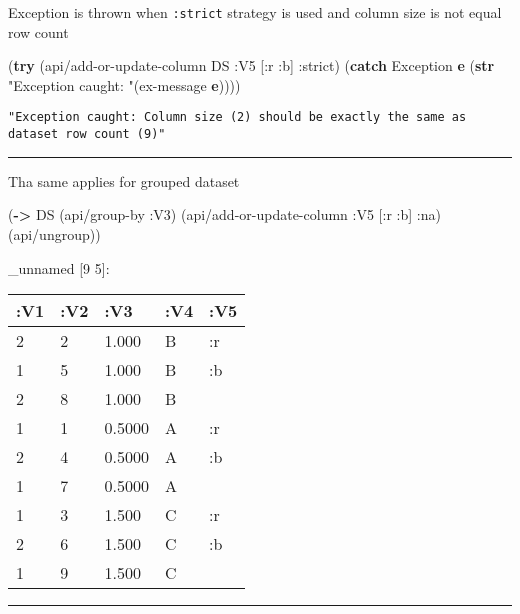 \documentclass[]{article}
\newenvironment{Shaded}{\begin{snugshade}}{\end{snugshade}}
\newcommand{\KeywordTok}[1]{\textcolor[rgb]{0.13,0.29,0.53}{\textbf{#1}}}
\newcommand{\StringTok}[1]{\textcolor[rgb]{0.31,0.60,0.02}{#1}}
\newcommand{\AttributeTok}[1]{\textcolor[rgb]{0.77,0.63,0.00}{#1}}
\newcommand{\NormalTok}[1]{#1}
\begin{document}
Exception is thrown when \texttt{:strict} strategy is used and column
size is not equal row count

\begin{Shaded}
\begin{Highlighting}[]
\NormalTok{(}\KeywordTok{try}
\NormalTok{  (api/add-or-update-column DS }\AttributeTok{:V5}\NormalTok{ [}\AttributeTok{:r} \AttributeTok{:b}\NormalTok{] }\AttributeTok{:strict}\NormalTok{)}
\NormalTok{  (}\KeywordTok{catch}\NormalTok{ Exception }\KeywordTok{e}\NormalTok{ (}\KeywordTok{str} \StringTok{"Exception caught: "}\NormalTok{(ex-message }\KeywordTok{e}\NormalTok{))))}
\end{Highlighting}
\end{Shaded}

\begin{verbatim}
"Exception caught: Column size (2) should be exactly the same as dataset row count (9)"
\end{verbatim}

\begin{center}\rule{0.5\linewidth}{0.5pt}\end{center}

Tha same applies for grouped dataset

\begin{Shaded}
\begin{Highlighting}[]
\NormalTok{(}\KeywordTok{->}\NormalTok{ DS}
\NormalTok{    (api/group-by }\AttributeTok{:V3}\NormalTok{)}
\NormalTok{    (api/add-or-update-column }\AttributeTok{:V5}\NormalTok{ [}\AttributeTok{:r} \AttributeTok{:b}\NormalTok{] }\AttributeTok{:na}\NormalTok{)}
\NormalTok{    (api/ungroup))}
\end{Highlighting}
\end{Shaded}

\_unnamed {[}9 5{]}:

\begin{longtable}[]{@{}lllll@{}}
\toprule
:V1 & :V2 & :V3 & :V4 & :V5\tabularnewline
\midrule
\endhead
2 & 2 & 1.000 & B & :r\tabularnewline
1 & 5 & 1.000 & B & :b\tabularnewline
2 & 8 & 1.000 & B &\tabularnewline
1 & 1 & 0.5000 & A & :r\tabularnewline
2 & 4 & 0.5000 & A & :b\tabularnewline
1 & 7 & 0.5000 & A &\tabularnewline
1 & 3 & 1.500 & C & :r\tabularnewline
2 & 6 & 1.500 & C & :b\tabularnewline
1 & 9 & 1.500 & C &\tabularnewline
\bottomrule
\end{longtable}

\begin{center}\rule{0.5\linewidth}{0.5pt}\end{center}
\end{document}
